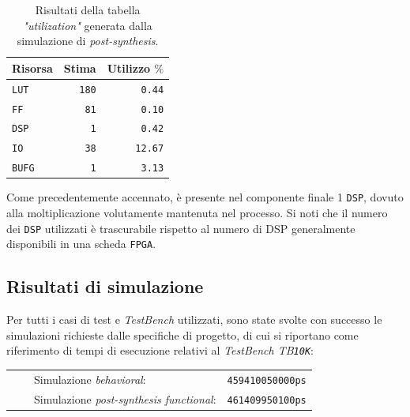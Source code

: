 \documentclass{article}
\newcommand{\tabitem}{~~\llap{\textbullet}~~}
\begin{document}
\begin{table}[ht]
    \centering
    \small
    \def\arraystretch{1.3} %
    \caption{Risultati della tabella \emph{"utilization"} generata dalla simulazione di \emph{post-synthesis}.}
    \begin{tabular}[width=4cm]{|| l | r | r ||}
        \hline
        Risorsa & Stima & Utilizzo $\%$\footnotemark  \\ 
        \hline \hline
        \texttt{LUT}     & \texttt{180} & \texttt{0.44}     \\ \hline
        \texttt{FF}      & \texttt{81}  & \texttt{0.10}     \\ \hline
        \texttt{DSP}     & \texttt{1}   & \texttt{0.42}     \\ \hline
        \texttt{IO}      & \texttt{38}  & \texttt{12.67}    \\ \hline
        \texttt{BUFG}    & \texttt{1}   & \texttt{3.13}     \\ \hline
    \end{tabular}
\end{table}
\vspace{0,3cm}

Come precedentemente accennato, è presente nel componente finale 1 \texttt{DSP}, dovuto alla moltiplicazione volutamente mantenuta nel processo. Si noti che il numero dei \texttt{DSP} utilizzati è trascurabile rispetto al numero di DSP generalmente disponibili in una scheda \texttt{FPGA}. 
\vspace{0,3cm}

\subsection{Risultati di simulazione}
Per tutti i casi di test e \emph{TestBench} utilizzati, sono state svolte con successo le simulazioni richieste dalle specifiche di progetto, di cui si riportano come riferimento di tempi di esecuzione relativi al \emph{TestBench TB\texttt{10K}}:\par
\def\arraystretch{1.3} %
\begin{tabular}{m{8cm} m{3cm}}
    \tabitem Simulazione \emph{behavioral}:                 & \texttt{459410050000ps}  \\  
    \tabitem Simulazione \emph{post-synthesis functional}:  & \texttt{461409950100ps}  \\  
\end{tabular}\vspace{0,3cm}
\end{document}
